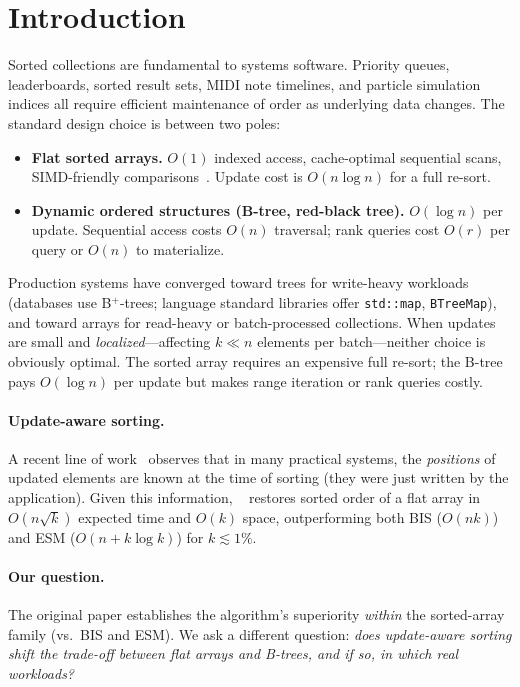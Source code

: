 \section{Introduction}
\label{sec:introduction}

Sorted collections are fundamental to systems software.
Priority queues, leaderboards, sorted result sets, MIDI note timelines,
and particle simulation indices all require efficient maintenance of order
as underlying data changes.
The standard design choice is between two poles:

\begin{itemize}
  \item \textbf{Flat sorted arrays.} $O(1)$ indexed access, cache-optimal sequential
    scans, SIMD-friendly comparisons~\cite{drepper2007memory}.
    Update cost is $O(n \log n)$ for a full re-sort.
  \item \textbf{Dynamic ordered structures (B-tree, red-black tree).}
    $O(\log n)$ per update. Sequential access costs $O(n)$ traversal;
    rank queries cost $O(r)$ per query or $O(n)$ to materialize.
\end{itemize}

Production systems have converged toward trees for write-heavy workloads
(databases use B$^+$-trees; language standard libraries offer
\texttt{std::map}, \texttt{BTreeMap}), and toward arrays for read-heavy or
batch-processed collections.
When updates are small and \emph{localized}---affecting $k \ll n$ elements
per batch---neither choice is obviously optimal.
The sorted array requires an expensive full re-sort; the B-tree pays $O(\log n)$
per update but makes range iteration or rank queries costly.

\paragraph{Update-aware sorting.}
A recent line of work~\cite{deltasort} observes that in many practical systems,
the \emph{positions} of updated elements are known at the time of sorting
(they were just written by the application).
Given this information, \DeltaSort~\cite{deltasort} restores sorted order of
a flat array in $O(n\sqrt{k})$ expected time and $O(k)$ space,
outperforming both BIS ($O(nk)$) and ESM ($O(n + k\log k)$) for $k \lesssim 1\%$.

\paragraph{Our question.}
The original \DeltaSort paper establishes the algorithm's superiority
\emph{within} the sorted-array family (vs.\ BIS and ESM).
We ask a different question: \emph{does update-aware sorting shift the
trade-off between flat arrays and B-trees, and if so, in which real workloads?}

